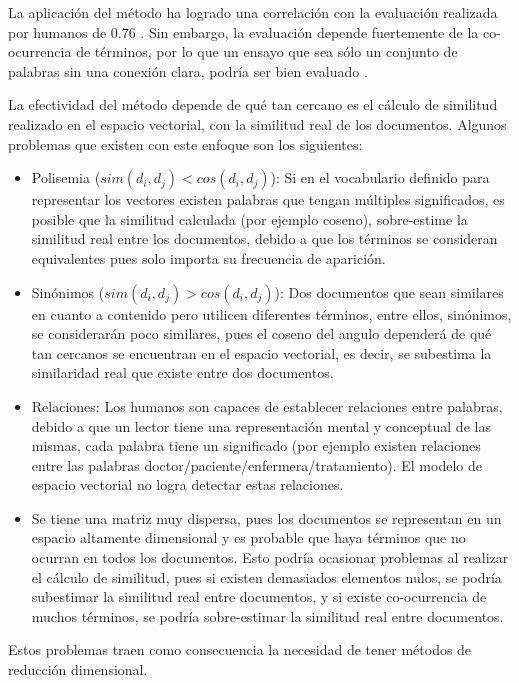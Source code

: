 \documentclass[12pt]{diicc}
\begin{document}
La aplicación del método ha logrado una correlación con la evaluación realizada por humanos de 0.76 \cite{t5}. Sin embargo, la evaluación depende fuertemente de la co-ocurrencia de términos, por lo que un ensayo que sea sólo un conjunto de palabras sin una conexión clara, podría ser bien evaluado \cite{t9}. 

La efectividad del método depende de qué tan cercano es el cálculo de similitud realizado en el espacio vectorial, con la similitud real de los documentos. Algunos problemas que existen con este enfoque son los siguientes:

\begin{itemize}
	\item Polisemia ($sim(d_i, d_j) < cos(d_i, d_j)$): Si en el vocabulario definido para representar los vectores existen palabras que tengan múltiples significados, es posible que la similitud calculada (por ejemplo coseno), sobre-estime la similitud real entre los documentos, debido a que los términos se consideran equivalentes pues solo importa su frecuencia de aparición.
	\item Sinónimos ($sim(d_i, d_j) > cos(d_i, d_j)$): Dos documentos que sean similares en cuanto a contenido pero utilicen diferentes términos, entre ellos, sinónimos, se considerarán poco similares, pues el coseno del angulo dependerá de qué tan cercanos se encuentran en el espacio vectorial, es decir, se subestima la similaridad real que existe entre dos documentos.
	\item Relaciones: Los humanos son capaces de establecer relaciones entre palabras, debido a que un lector tiene una representación mental y conceptual de las mismas, cada palabra tiene un significado (por ejemplo existen relaciones entre las palabras doctor/paciente/enfermera/tratamiento). El modelo de espacio vectorial no logra detectar estas relaciones.
	\item Se tiene una matriz muy dispersa, pues los documentos se representan en un espacio altamente dimensional y es probable que haya términos que no ocurran en todos los documentos. Esto podría ocasionar problemas al realizar el cálculo de similitud, pues si existen demasiados elementos nulos, se podría subestimar la similitud real entre documentos, y si existe co-ocurrencia de muchos términos, se podría sobre-estimar la similitud real entre documentos.
\end{itemize}

Estos problemas traen como consecuencia la necesidad de tener métodos de reducción dimensional.
\end{document}
